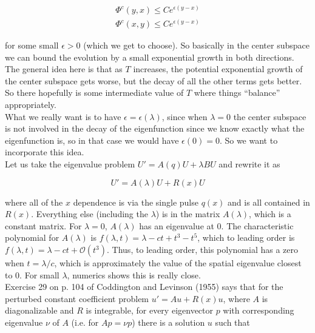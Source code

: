 \documentclass[12pt]{article}
\begin{document}
\begin{align*}
\Phi^c(y, x) \leq C e^{\epsilon(y-x)} \\
\Phi^c(x, y) \leq C e^{\epsilon(y-x)}
\end{align*}

for some small $\epsilon > 0$ (which we get to choose). So basically in the center subspace we can bound the evolution by a small exponential growth in both directions.\\

The general idea here is that as $T$ increases, the potential exponential growth of the center subspace gets worse, but the decay of all the other terms gets better. So there hopefully is some intermediate value of $T$ where things ``balance'' appropriately.\\

What we really want is to have $\epsilon = \epsilon(\lambda)$, since when $\lambda = 0$ the center subspace is not involved in the decay of the eigenfunction since we know exactly what the eigenfunction is, so in that case we would have $\epsilon(0) = 0$. So we want to incorporate this idea.\\

Let us take the eigenvalue problem $U' = A(q) U + \lambda B U$ and rewrite it as

\begin{equation}\label{Wprime}
U' = A(\lambda) U + R(x) U
\end{equation}

where all of the $x$ dependence is via the single pulse $q(x)$ and is all contained in $R(x)$. Everything else (including the $\lambda$) is in the matrix $A(\lambda)$, which is a constant matrix. For $\lambda = 0$, $A(\lambda)$ has an eigenvalue at 0. The characteristic polynomial for $A(\lambda)$ is $f(\lambda, t) = \lambda - c t + t^3 - t^5$, which to leading order is $f(\lambda, t) = \lambda - c t + \mathcal{O}(t^3)$. Thus, to leading order, this polynomial has a zero when $t = \lambda / c$, which is approximately the value of the spatial eigenvalue closest to 0. For small $\lambda$, numerics shows this is really close.\\

Exercise 29 on p. 104 of Coddington and Levinson (1955) says that for the perturbed constant coefficient problem $u' = Au + R(x)u$, where $A$ is diagonalizable and $R$ is integrable, for every eigenvector $p$ with corresponding eigenvalue $\nu$ of $A$ (i.e. for $Ap = \nu p$) there is a solution $u$ such that
\end{document}
